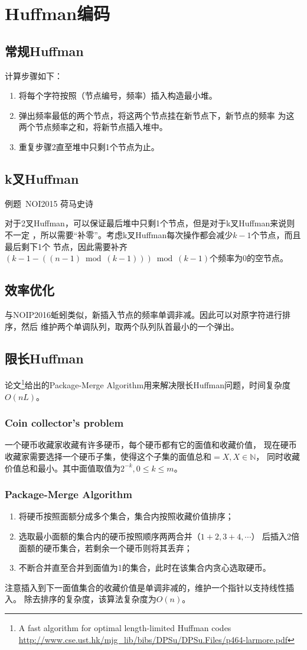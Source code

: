 \section{Huffman编码}
\subsection{常规Huffman}
计算步骤如下：
\begin{enumerate}
	\item 将每个字符按照（节点编号，频率）插入构造最小堆。
	\item 弹出频率最低的两个节点，将这两个节点挂在新节点下，新节点的频率
	      为这两个节点频率之和，将新节点插入堆中。
	\item 重复步骤2直至堆中只剩1个节点为止。
\end{enumerate}
\subsection{k叉Huffman}
例题~NOI2015 荷马史诗

对于2叉Huffman，可以保证最后堆中只剩1个节点，但是对于k叉Huffman来说则不一定
，所以需要``补零''。考虑k叉Huffman每次操作都会减少$k-1$个节点，而且最后剩下1个
节点，因此需要补齐$(k-1 - ((n-1) \bmod (k-1))) \bmod (k-1)$个频率为0的空节点。
\subsection{效率优化}
与NOIP2016蚯蚓类似，新插入节点的频率单调非减。因此可以对原字符进行排序，然后
维护两个单调队列，取两个队列队首最小的一个弹出。
\subsection{限长Huffman}
论文\footnote{A fast algorithm for optimal length-limited Huffman codes\\
	\url{http://www.cse.ust.hk/mjg\_lib/bibs/DPSu/DPSu.Files/p464-larmore.pdf}
}\cite{LLH}给出的Package-Merge Algorithm用来解决限长Huffman问题，时间复杂度$O(nL)$。
\subsubsection{Coin collector's problem}
一个硬币收藏家收藏有许多硬币，每个硬币都有它的面值和收藏价值，
现在硬币收藏家需要选择一个硬币子集，使得这个子集的面值总和$=X,X\in \mathbb{N}$，
同时收藏价值总和最小。其中面值取值为$2^{-k},0\leq k \leq m$。
\subsubsection{Package-Merge Algorithm}
\begin{enumerate}
	\item 将硬币按照面额分成多个集合，集合内按照收藏价值排序；
	\item 选取最小面额的集合内的硬币按照顺序两两合并（$1+2,3+4,\cdots$）
	      后插入2倍面额的硬币集合，若剩余一个硬币则将其丢弃；
	\item 不断合并直至合并到面值为1的集合，此时在该集合内贪心选取硬币。
\end{enumerate}
注意插入到下一面值集合的收藏价值是单调非减的，维护一个指针以支持线性插入。
除去排序的复杂度，该算法复杂度为$O(n)$。

